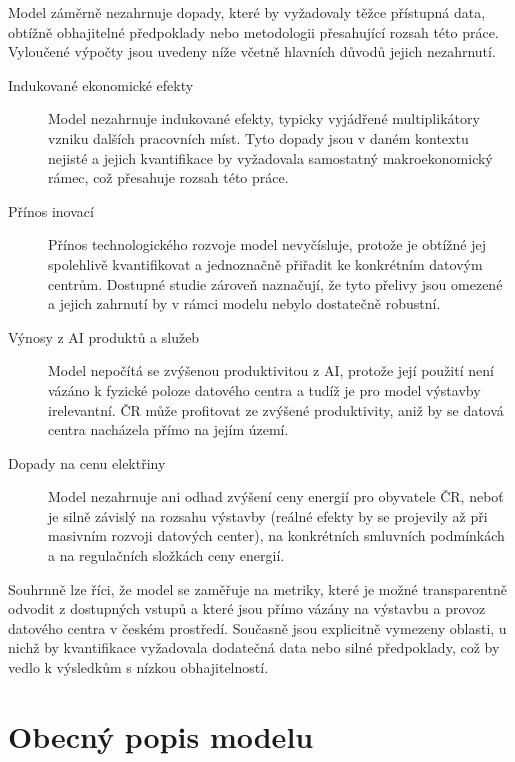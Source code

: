 Model záměrně nezahrnuje dopady, které by vyžadovaly těžce přístupná data, obtížně obhajitelné předpoklady nebo metodologii přesahující rozsah této práce. Vyloučené výpočty jsou uvedeny níže včetně hlavních důvodů jejich nezahrnutí.

\begin{description}
	\item[Indukované ekonomické efekty] Model nezahrnuje indukované efekty, typicky vyjádřené multiplikátory vzniku dalších pracovních míst. Tyto dopady jsou v daném kontextu nejisté a jejich kvantifikace by vyžadovala samostatný makroekonomický rámec, což přesahuje rozsah této práce.

	\item[Přínos inovací] Přínos technologického rozvoje model nevyčísluje, protože je obtížné jej spolehlivě kvantifikovat a jednoznačně přiřadit ke konkrétním datovým centrům. Dostupné studie zároveň naznačují, že tyto přelivy jsou omezené a jejich zahrnutí by v rámci modelu nebylo dostatečně robustní.

	\item[Výnosy z AI produktů a služeb] Model nepočítá se zvýšenou produktivitou z AI, protože její použití není vázáno k fyzické poloze datového centra a tudíž je pro model výstavby irelevantní. ČR může profitovat ze zvýšené produktivity, aniž by se datová centra nacházela přímo na jejím území.

	\item[Dopady na cenu elektřiny] Model nezahrnuje ani odhad zvýšení ceny energií pro obyvatele ČR, neboť je silně závislý na rozsahu výstavby (reálné efekty by se projevily až při masivním rozvoji datových center), na konkrétních smluvních podmínkách a na regulačních složkách ceny energií.
	
\end{description}

Souhrnně lze říci, že model se zaměřuje na metriky, které je možné transparentně odvodit z dostupných vstupů a které jsou přímo vázány na výstavbu a provoz datového centra v českém prostředí. Současně jsou explicitně vymezeny oblasti, u nichž by kvantifikace vyžadovala dodatečná data nebo silné předpoklady, což by vedlo k výsledkům s nízkou obhajitelností.

\section{Obecný popis modelu}
\label{sec:model_popis}


